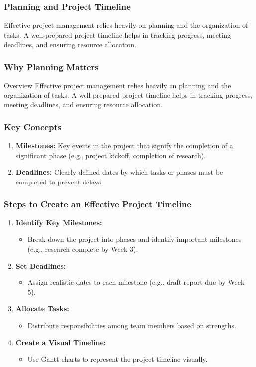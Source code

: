 \documentclass[aspectratio=169]{beamer}
\begin{document}
\begin{frame}[fragile]
    \frametitle{Planning and Project Timeline}
    Effective project management relies heavily on planning and the organization of tasks. A well-prepared project timeline helps in tracking progress, meeting deadlines, and ensuring resource allocation.
\end{frame}

\begin{frame}[fragile]
    \frametitle{Why Planning Matters}
    \begin{block}{Overview}
        Effective project management relies heavily on planning and the organization of tasks. A well-prepared project timeline helps in tracking progress, meeting deadlines, and ensuring resource allocation.
    \end{block}
\end{frame}

\begin{frame}[fragile]
    \frametitle{Key Concepts}
    \begin{enumerate}
        \item \textbf{Milestones:} Key events in the project that signify the completion of a significant phase (e.g., project kickoff, completion of research).
        \item \textbf{Deadlines:} Clearly defined dates by which tasks or phases must be completed to prevent delays.
    \end{enumerate}
\end{frame}

\begin{frame}[fragile]
    \frametitle{Steps to Create an Effective Project Timeline}
    \begin{enumerate}
        \item \textbf{Identify Key Milestones:}
          \begin{itemize}
              \item Break down the project into phases and identify important milestones (e.g., research complete by Week 3).
          \end{itemize}
        \item \textbf{Set Deadlines:}
          \begin{itemize}
              \item Assign realistic dates to each milestone (e.g., draft report due by Week 5).
          \end{itemize}
        \item \textbf{Allocate Tasks:}
          \begin{itemize}
              \item Distribute responsibilities among team members based on strengths.
          \end{itemize}
        \item \textbf{Create a Visual Timeline:}
          \begin{itemize}
              \item Use Gantt charts to represent the project timeline visually.
          \end{itemize}
    \end{enumerate}
\end{frame}
\end{document}

